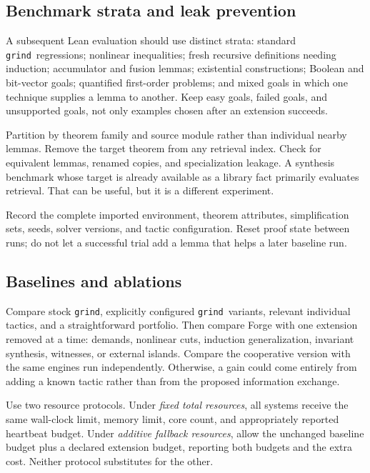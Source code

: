 \documentclass[11pt,a4paper]{article}
\newcommand{\grind}{\texttt{grind}}
\begin{document}
\subsection{Benchmark strata and leak prevention}

A subsequent Lean evaluation should use distinct strata: standard \grind\
regressions; nonlinear inequalities; fresh recursive definitions needing
induction; accumulator and fusion lemmas; existential constructions; Boolean
and bit-vector goals; quantified first-order problems; and mixed goals in
which one technique supplies a lemma to another. Keep easy goals, failed goals,
and unsupported goals, not only examples chosen after an extension succeeds.

Partition by theorem family and source module rather than individual nearby
lemmas. Remove the target theorem from any retrieval index. Check for equivalent
lemmas, renamed copies, and specialization leakage. A synthesis benchmark
whose target is already available as a library fact primarily evaluates
retrieval. That can be useful, but it is a different experiment.

Record the complete imported environment, theorem attributes, simplification
sets, seeds, solver versions, and tactic configuration. Reset proof state
between runs; do not let a successful trial add a lemma that helps a later
baseline run.

\subsection{Baselines and ablations}

Compare stock \grind, explicitly configured \grind\ variants, relevant
individual tactics, and a straightforward portfolio. Then compare Forge with
one extension removed at a time: demands, nonlinear cuts, induction
generalization, invariant synthesis, witnesses, or external islands. Compare
the cooperative version with the same engines run independently. Otherwise,
a gain could come entirely from adding a known tactic rather than from the
proposed information exchange.

Use two resource protocols. Under \emph{fixed total resources}, all systems
receive the same wall-clock limit, memory limit, core count, and appropriately
reported heartbeat budget. Under \emph{additive fallback resources}, allow the
unchanged baseline budget plus a declared extension budget, reporting both
budgets and the extra cost. Neither protocol substitutes for the other.
\end{document}
